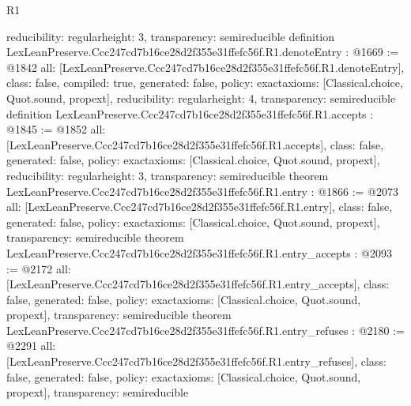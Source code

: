 \begin{lexlean}{R1}
\begin{coremodule}
{  reducibility: regular{height: 3},
  transparency: semireducible
}
definition LexLeanPreserve.Ccc247cd7b16ce28d2f355e31ffefc56f.R1.denoteEntry : @1669 := @1842 {
  all: [LexLeanPreserve.Ccc247cd7b16ce28d2f355e31ffefc56f.R1.denoteEntry],
  class: false,
  compiled: true,
  generated: false,
  policy: exact{axioms: [Classical.choice, Quot.sound, propext]},
  reducibility: regular{height: 4},
  transparency: semireducible
}
definition LexLeanPreserve.Ccc247cd7b16ce28d2f355e31ffefc56f.R1.accepts : @1845 := @1852 {
  all: [LexLeanPreserve.Ccc247cd7b16ce28d2f355e31ffefc56f.R1.accepts],
  class: false,
  generated: false,
  policy: exact{axioms: [Classical.choice, Quot.sound, propext]},
  reducibility: regular{height: 3},
  transparency: semireducible
}
theorem LexLeanPreserve.Ccc247cd7b16ce28d2f355e31ffefc56f.R1.entry : @1866 := @2073 {
  all: [LexLeanPreserve.Ccc247cd7b16ce28d2f355e31ffefc56f.R1.entry],
  class: false,
  generated: false,
  policy: exact{axioms: [Classical.choice, Quot.sound, propext]},
  transparency: semireducible
}
theorem LexLeanPreserve.Ccc247cd7b16ce28d2f355e31ffefc56f.R1.entry_accepts : @2093 := @2172 {
  all: [LexLeanPreserve.Ccc247cd7b16ce28d2f355e31ffefc56f.R1.entry_accepts],
  class: false,
  generated: false,
  policy: exact{axioms: [Classical.choice, Quot.sound, propext]},
  transparency: semireducible
}
theorem LexLeanPreserve.Ccc247cd7b16ce28d2f355e31ffefc56f.R1.entry_refuses : @2180 := @2291 {
  all: [LexLeanPreserve.Ccc247cd7b16ce28d2f355e31ffefc56f.R1.entry_refuses],
  class: false,
  generated: false,
  policy: exact{axioms: [Classical.choice, Quot.sound, propext]},
  transparency: semireducible
}


\end{coremodule}
\end{lexlean}
